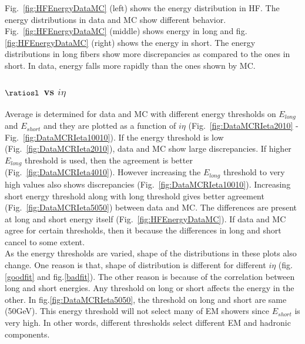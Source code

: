 Fig.~\ref{fig:HFEnergyDataMC} (left) shows the energy distribution in HF. The energy distributions in data and MC show different behavior. Fig.~\ref{fig:HFEnergyDataMC} (middle) shows energy in long and fig.\ref{fig:HFEnergyDataMC} (right) shows the energy in short. The energy distributions in long fibers show more discrepancies as compared to the ones in short. In data, energy falls more rapidly than the ones shown by MC.

\subsubsection{$ \ratiosl$ vs $i\eta$}
Average \ratiosl is determined for data and MC with different energy thresholds on $E_{long}$ and $E_{short}$ and they are plotted as a function of $i\eta$ (Fig.~\ref{fig:DataMCRIeta2010} - Fig.~\ref{fig:DataMCRIeta10010}). If the energy threshold is low (Fig.~\ref{fig:DataMCRIeta2010}), data and MC show large discrepancies. If  higher $E_{long}$ threshold is used, then the agreement is better (Fig.~\ref{fig:DataMCRIeta4010}). However increasing the $E_{long}$ threshold to very high values also shows discrepancies (Fig.~\ref{fig:DataMCRIeta10010}). Increasing short energy threshold along with long threshold gives better agreement (Fig.~\ref{fig:DataMCRIeta5050}) between data and MC. The differences are present at long and short energy itself (Fig.~\ref{fig:HFEnergyDataMC}). If data and MC agree for certain thresholds, then it because the differences in long and short cancel to some extent.\\
As the energy thresholds are varied, shape of the distributions in these plots also change. One reason is that, shape of \ratiosl distribution is different for different $i\eta$ (fig.\ref{goodfit} and fig.\ref{badfit}). The other reason is because of the correlation between long and short energies. Any threshold on long or short affects the energy in the other. In fig.\ref{fig:DataMCRIeta5050}, the threshold on long and short are same (50GeV). This energy threshold will not select many of EM showers since $E_{short}$ is very high. In other words, different thresholds select different EM and hadronic components.

